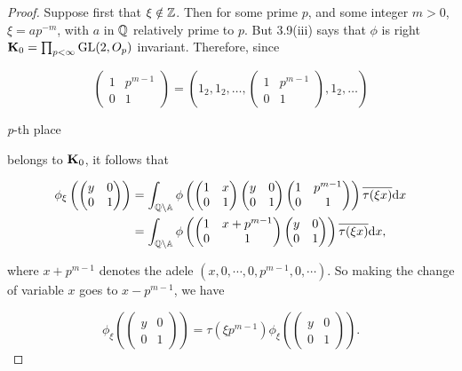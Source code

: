 \begin{proof}

Suppose first that $\xi \notin \mathbb{Z}$. Then for some prime $p$, and some integer $m > 0$, $\xi = ap^{-m}$, with $a$ in $\mathbb{Q}$ relatively prime to $p$. But 3.9(iii) says that $\phi$ is right $\mathbf{K}_0 = \prod_{p<\infty}\operatorname{GL}(2,O_p)$ invariant. Therefore, since

\[
\begin{pmatrix} 1 & p^{m-1} \\ 0 & 1 \end{pmatrix} = \left(1_2, 1_2, \dots, \begin{pmatrix} 1 & p^{m-1} \\ 0 & 1 \end{pmatrix}, 1_2, \dots\right)
\]

\hfill \textit{p}-th place

belongs to $\mathbf{K}_0$, it follows that

\[
\begin{aligned}
\phi_\xi\left(\begin{pmatrix} y & 0 \\ 0 & 1 \end{pmatrix}\right) &= \int_{\mathbb{Q}\backslash\mathbb{A}}\phi\left(\begin{pmatrix} 1 & x \\ 0 & 1 \end{pmatrix}\begin{pmatrix} y & 0 \\ 0 & 1 \end{pmatrix}\begin{pmatrix} 1 & p^{m-1} \\ 0 & 1 \end{pmatrix}\right)\overline{\tau(\xi x)}\mathrm{d} x\\
&= \int_{\mathbb{Q}\backslash\mathbb{A}}\phi\left(\begin{pmatrix} 1 & x+p^{m-1} \\ 0 & 1 \end{pmatrix}\begin{pmatrix} y & 0 \\ 0 & 1 \end{pmatrix}\right)\overline{\tau(\xi x)}\mathrm{d} x,
\end{aligned}
\]

where $x+p^{m-1}$ denotes the adele $(x,0,\cdots,0,p^{m-1},0,\cdots)$. So making the change of variable $x$ goes to $x-p^{m-1}$, we have

\begin{equation}\label{eq:3.14}
\phi_\xi\left(\begin{pmatrix} y & 0 \\ 0 & 1 \end{pmatrix}\right) = \tau(\xi p^{m-1})\phi_\xi\left(\begin{pmatrix} y & 0 \\ 0 & 1 \end{pmatrix}\right).\tag{3.14}
\end{equation}


\end{proof}
